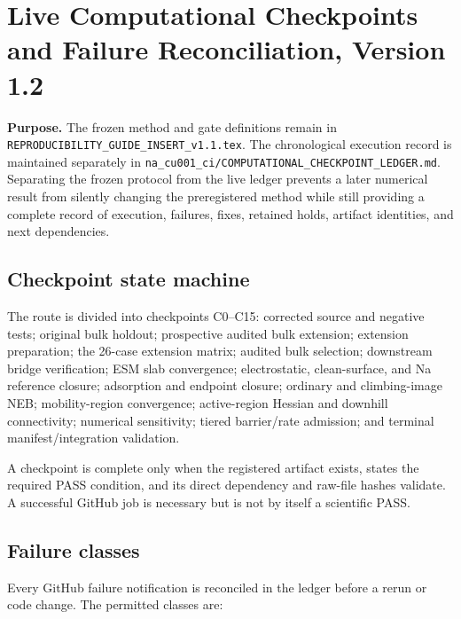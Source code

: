 \section*{Live Computational Checkpoints and Failure Reconciliation, Version 1.2}

\noindent\textbf{Purpose.}
The frozen method and gate definitions remain in
\texttt{REPRODUCIBILITY\_GUIDE\_INSERT\_v1.1.tex}.  The chronological execution
record is maintained separately in
\texttt{na\_cu001\_ci/COMPUTATIONAL\_CHECKPOINT\_LEDGER.md}.  Separating the
frozen protocol from the live ledger prevents a later numerical result from
silently changing the preregistered method while still providing a complete
record of execution, failures, fixes, retained holds, artifact identities, and
next dependencies.

\subsection*{Checkpoint state machine}

The route is divided into checkpoints C0--C15: corrected source and negative
tests; original bulk holdout; prospective audited bulk extension; extension
preparation; the 26-case extension matrix; audited bulk selection; downstream
bridge verification; ESM slab convergence; electrostatic, clean-surface, and Na
reference closure; adsorption and endpoint closure; ordinary and climbing-image
NEB; mobility-region convergence; active-region Hessian and downhill
connectivity; numerical sensitivity; tiered barrier/rate admission; and terminal
manifest/integration validation.

A checkpoint is complete only when the registered artifact exists, states the
required PASS condition, and its direct dependency and raw-file hashes validate.
A successful GitHub job is necessary but is not by itself a scientific PASS.

\subsection*{Failure classes}

Every GitHub failure notification is reconciled in the ledger before a rerun or
code change.  The permitted classes are:


